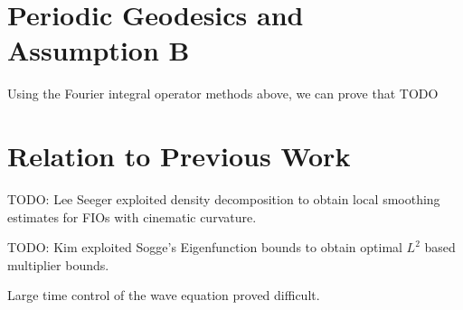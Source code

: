 \section{Periodic Geodesics and Assumption B}

Using the Fourier integral operator methods above, we can prove that TODO

\section{Relation to Previous Work}

TODO: Lee Seeger exploited density decomposition to obtain local smoothing estimates for FIOs with cinematic curvature.

TODO: Kim exploited Sogge's Eigenfunction bounds to obtain optimal $L^2$ based multiplier bounds.

Large time control of the wave equation proved difficult.